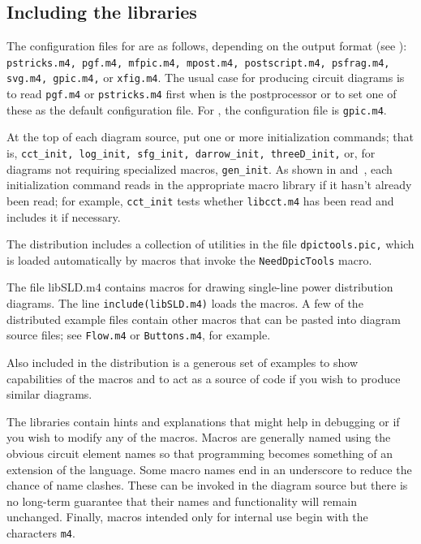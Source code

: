 \subsection{Including the libraries\label{Libraries:}}
The configuration files for \dpic are as follows,
depending on the output format (see ):
{\tt pstricks.m4, pgf.m4, mfpic.m4, mpost.m4, postscript.m4, psfrag.m4, svg.m4,
 gpic.m4,} or {\tt xfig.m4}.
The usual case for producing circuit diagrams is to read
 {\tt pgf.m4} or {\tt pstricks.m4}
 first when \dpic is the postprocessor or
to set one of these as the default configuration file.
For \gpic, the configuration file is {\tt gpic.m4}.

\pagebreak
At the top of each diagram source, put one or more initialization
commands; that is,
{\tt cct\_init, log\_init, sfg\_init, darrow\_init, threeD\_init,}
or, for diagrams not requiring specialized macros, {\tt gen\_init}.
As shown in  and~,
each initialization command reads in the appropriate macro
library if it hasn't already been read;
for example, {\tt cct\_init} tests whether {\tt libcct.m4} has been
read and includes it if necessary.

The distribution includes a collection of \pic utilities in the file
{\tt dpictools.pic,} which is loaded automatically by macros that
invoke the {\tt NeedDpicTools} macro.

The file libSLD.m4 contains macros for drawing single-line
power distribution diagrams.  The line
{\tt include(libSLD.m4)} loads the macros.
A few of the distributed example files contain other macros
that can be pasted into diagram source files; see
{\tt Flow.m4} or {\tt Buttons.m4}, for example.

Also included in the distribution is a generous set of examples
to show capabilities of the macros and to act as a source of code
if you wish to produce similar diagrams.

The libraries contain hints and explanations that might help in debugging
or if you wish to modify any of the macros.  Macros are generally named
using the obvious circuit element names so that programming becomes
something of an extension of the \pic language.  Some macro names end
in an underscore to reduce the chance of name clashes.  These can be
invoked in the diagram source but there is no long-term guarantee that
their names and functionality will remain unchanged. Finally, macros
intended only for internal use begin with the characters {\tt m4}.

